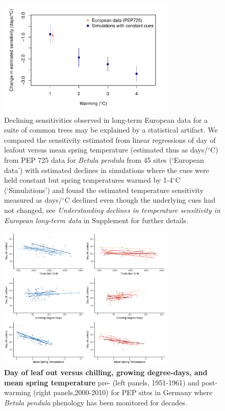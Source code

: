 \documentclass{article}
\begin{document}
\newpage
\begin{figure}[h!]
\centering
\noindent \includegraphics[width=0.75\textwidth]{..//..//analyses/bb_analysis/PEP_climate/figures/peprealandsims.pdf}
\caption{Declining sensitivities observed in long-term European data for a suite of common trees may be explained by a statistical artifact. We compared the sensitivity estimated from linear regressions of day of leafout versus mean spring temperature (estimated thus as days/$^{\circ}$C) from PEP 725 data for \emph{Betula pendula} from 45 sites (`European data') with estimated declines in simulations where the cues were held constant but spring temperatures warmed by 1-4$^{\circ}$C (`Simulations') and found the estimated temperature sensitivity measured as days/$^{\circ}$C declined even though the underlying cues had not changed, see \emph{Understanding declines in temperature sensitivity in European long-term data} in Supplement for further details.}
\label{fig:pepsims}
\end{figure}


\newpage
\begin{figure}[h!]
\centering
\noindent \includegraphics[width=0.75\textwidth]{..//..//analyses/bb_analysis/PEP_climate/figures/betpen_multruns_utahgddmat.pdf}
\caption{\textbf{Day of leaf out versus chilling, growing degree-days, and mean spring temperature} pre- (left panels, 1951-1961) and post- warming (right panels,2000-2010) for PEP sites in Germany where \emph{Betula pendula} phenology has been monitored for decades.}
\label{fig:pep}
\end{figure}
\end{document}
